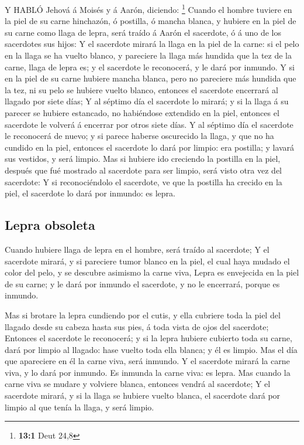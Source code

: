  Y HABLÓ Jehová á Moisés y á Aarón, diciendo: \footnote{\textbf{13:1}
  Deut 24,8}  Cuando el hombre tuviere en la piel de su
carne hinchazón, ó postilla, ó mancha blanca, y hubiere en la piel de su
carne como llaga de lepra, será traído á Aarón el sacerdote, ó á uno de
los sacerdotes sus hijos:  Y el sacerdote mirará la llaga en
la piel de la carne: si el pelo en la llaga se ha vuelto blanco, y
pareciere la llaga más hundida que la tez de la carne, llaga de lepra
es; y el sacerdote le reconocerá, y le dará por inmundo.  Y
si en la piel de su carne hubiere mancha blanca, pero no pareciere más
hundida que la tez, ni su pelo se hubiere vuelto blanco, entonces el
sacerdote encerrará al llagado por siete días;  Y al séptimo
día el sacerdote lo mirará; y si la llaga á su parecer se hubiere
estancado, no habiéndose extendido en la piel, entonces el sacerdote le
volverá á encerrar por otros siete días.  Y al séptimo día
el sacerdote le reconocerá de nuevo; y si parece haberse oscurecido la
llaga, y que no ha cundido en la piel, entonces el sacerdote lo dará por
limpio: era postilla; y lavará sus vestidos, y será limpio. 
Mas si hubiere ido creciendo la postilla en la piel, después que fué
mostrado al sacerdote para ser limpio, será visto otra vez del
sacerdote:  Y si reconociéndolo el sacerdote, ve que la
postilla ha crecido en la piel, el sacerdote lo dará por inmundo: es
lepra.

\hypertarget{lepra-obsoleta}{%
\subsection{Lepra obsoleta}\label{lepra-obsoleta}}

 Cuando hubiere llaga de lepra en el hombre, será traído al
sacerdote;  Y el sacerdote mirará, y si pareciere tumor
blanco en la piel, el cual haya mudado el color del pelo, y se descubre
asimismo la carne viva,  Lepra es envejecida en la piel de
su carne; y le dará por inmundo el sacerdote, y no le encerrará, porque
es inmundo.

 Mas si brotare la lepra cundiendo por el cutis, y ella
cubriere toda la piel del llagado desde su cabeza hasta sus pies, á toda
vista de ojos del sacerdote;  Entonces el sacerdote le
reconocerá; y si la lepra hubiere cubierto toda su carne, dará por
limpio al llagado: hase vuelto toda ella blanca; y él es limpio.
 Mas el día que apareciere en él la carne viva, será
inmundo.  Y el sacerdote mirará la carne viva, y lo dará
por inmundo. Es inmunda la carne viva: es lepra.  Mas
cuando la carne viva se mudare y volviere blanca, entonces vendrá al
sacerdote;  Y el sacerdote mirará, y si la llaga se hubiere
vuelto blanca, el sacerdote dará por limpio al que tenía la llaga, y
será limpio.

